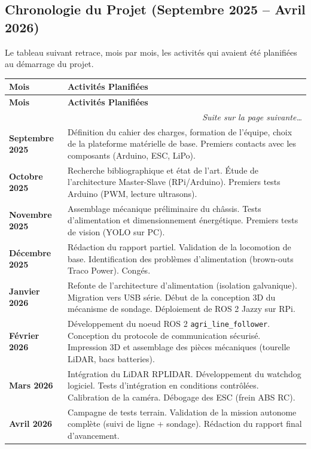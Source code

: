 \subsection{Chronologie du Projet (Septembre 2025 -- Avril 2026)}

Le tableau suivant retrace, mois par mois, les activités qui avaient été planifiées au démarrage du projet.

\renewcommand{\arraystretch}{1.5}
\begin{longtable}{|p{2.8cm}|p{11cm}|}
\hline
\rowcolor{headerblue!20}
\textbf{Mois} & \textbf{Activités Planifiées} \\
\hline
\endfirsthead
\hline
\rowcolor{headerblue!20}
\textbf{Mois} & \textbf{Activités Planifiées} \\
\hline
\endhead
\hline
\multicolumn{2}{r}{\textit{Suite sur la page suivante\ldots}}\\
\endfoot
\hline
\endlastfoot

\textbf{Septembre 2025}
& Définition du cahier des charges, formation de l'équipe, choix de la plateforme matérielle de base. Premiers contacts avec les composants (Arduino, ESC, LiPo). \\
\hline

\rowcolor{rowalt}
\textbf{Octobre 2025}
& Recherche bibliographique et état de l'art. Étude de l'architecture Master-Slave (RPi/Arduino). Premiers tests Arduino (PWM, lecture ultrasons). \\
\hline

\textbf{Novembre 2025}
& Assemblage mécanique préliminaire du châssis. Tests d'alimentation et dimensionnement énergétique. Premiers tests de vision (YOLO sur PC). \\
\hline

\rowcolor{rowalt}
\textbf{Décembre 2025}
& Rédaction du rapport partiel. Validation de la locomotion de base. Identification des problèmes d'alimentation (brown-outs Traco Power). Congés. \\
\hline

\textbf{Janvier 2026}
& Refonte de l'architecture d'alimentation (isolation galvanique). Migration vers USB série. Début de la conception 3D du mécanisme de sondage. Déploiement de ROS 2 Jazzy sur RPi. \\
\hline

\rowcolor{rowalt}
\textbf{Février 2026}
& Développement du noeud ROS 2 \texttt{agri\_line\_follower}. Conception du protocole de communication sécurisé. Impression 3D et assemblage des pièces mécaniques (tourelle LiDAR, bacs batteries). \\
\hline

\textbf{Mars 2026}
& Intégration du LiDAR RPLIDAR. Développement du watchdog logiciel. Tests d'intégration en conditions contrôlées. Calibration de la caméra. Débogage des ESC (frein ABS RC). \\
\hline

\rowcolor{rowalt}
\textbf{Avril 2026}
& Campagne de tests terrain. Validation de la mission autonome complète (suivi de ligne + sondage). Rédaction du rapport final d'avancement. \\
\hline

\end{longtable}

